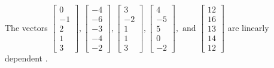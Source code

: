 \begin{exercise}
\begin{exerciseStatement}
  \end{exerciseStatement}
  \begin{exerciseAnswer}
   The vectors \(\left[\begin{array}{r}
0 \\
-1 \\
2 \\
1 \\
3
\end{array}\right] , \left[\begin{array}{r}
-4 \\
-6 \\
-3 \\
-4 \\
-2
\end{array}\right] , \left[\begin{array}{r}
3 \\
-2 \\
1 \\
1 \\
3
\end{array}\right] , \left[\begin{array}{r}
4 \\
-5 \\
5 \\
0 \\
-2
\end{array}\right] , \text{ and } \left[\begin{array}{r}
12 \\
16 \\
13 \\
14 \\
12
\end{array}\right]\) are 
  	 linearly dependent  .
  


  \end{exerciseAnswer}
\end{exercise}